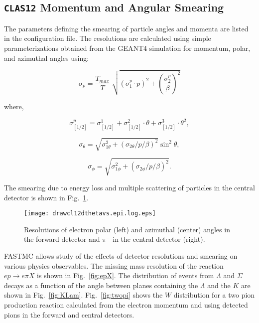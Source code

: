 \subsection{{\tt CLAS12} Momentum and Angular Smearing}

The parameters defining the smearing of particle angles and momenta 
are listed in the configuration file.  The resolutions are calculated 
using simple parameterizations obtained from the GEANT4 simulation for 
momentum, polar, and azimuthal angles using:

\begin{equation}
\sigma_p =  \frac{T_{max}}{T} \sqrt[]{(\sigma_1^p \cdot p)^2 + 
\left( \frac{\sigma_2^p}{\beta} \right)^2}
\end{equation}

\noindent
where,

\begin{equation}
\sigma_{[1/2]}^p = \sigma_{[{1/2}]}^1 + \sigma_{[{1/2}]}^2 \cdot \theta 
+ \sigma_{[{1/2}]}^3 \cdot \theta^2,
\end{equation}

\begin{equation}
\sigma_\theta=\sqrt{\sigma_{1\theta}^2
+(\sigma_{2\theta}/p/\beta)^2}\sin^2\theta,
\end{equation}

\begin{equation}
\sigma_\phi=\sqrt{\sigma_{1\phi}^2+(\sigma_{2\phi}/p/\beta)^2}.
\end{equation}

The smearing due to energy loss and multiple scattering of particles in 
the central detector is shown in Fig.~\ref{fig:smear}.

\begin{figure}[htbp]
\centering
\texttt{[image: drawcl12dthetavs.epi.log.eps]} 
\caption{\small{Resolutions of electron polar (left) and azimuthal (center) 
angles in the forward detector and $\pi^-$  in the central detector (right).}}
\label{fig:smear}
\end{figure}

FASTMC allows study of the effects of detector resolutions and smearing on 
various physics observables. The missing mass resolution of the reaction 
$ep \to e\pi X$ is shown in Fig.~\ref{fig:epX}.  The distribution of events 
from $\Lambda$ and $\Sigma$ decays as a function of the angle between planes 
containing the $\Lambda$ and the $K$ are shown in Fig.~\ref{fig:KLam}.
Fig.~\ref{fig:twopi} shows the $W$ distribution for a two pion production
reaction calculated from the electron momentum and using detected pions in 
the forward and central detectors. 

